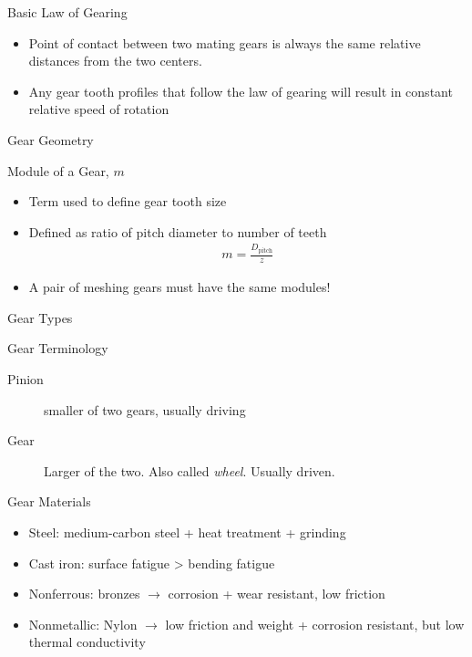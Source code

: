 \documentclass[a4paper,openany]{tufte-book}
\begin{document}
Basic Law of Gearing

\begin{itemize}
\item Point of contact between two mating gears is always the same relative
distances from the two centers.

\item Any gear tooth profiles that follow the law of gearing will result in
constant relative speed of rotation
\end{itemize}

Gear Geometry

Module of a Gear, \(m\)

\begin{itemize}
\item Term used to define gear tooth size

\item Defined as ratio of pitch diameter to number of teeth
\begin{align}
            m = \frac{D_{\text{pitch}}}{z}
          \end{align}

\item A pair of meshing gears must have the same modules!
\end{itemize}

Gear Types

Gear Terminology

\begin{description}
\item[{Pinion}] smaller of two gears, usually driving

\item[{Gear}] Larger of the two. Also called \emph{wheel}. Usually driven.
\end{description}

Gear Materials

\begin{itemize}
\item Steel: medium-carbon steel + heat treatment + grinding

\item Cast iron: surface fatigue > bending fatigue

\item Nonferrous: bronzes \(\rightarrow\) corrosion + wear resistant, low
friction

\item Nonmetallic: Nylon \(\rightarrow\) low friction and weight + corrosion
resistant, but low thermal conductivity
\end{itemize}
\end{document}
